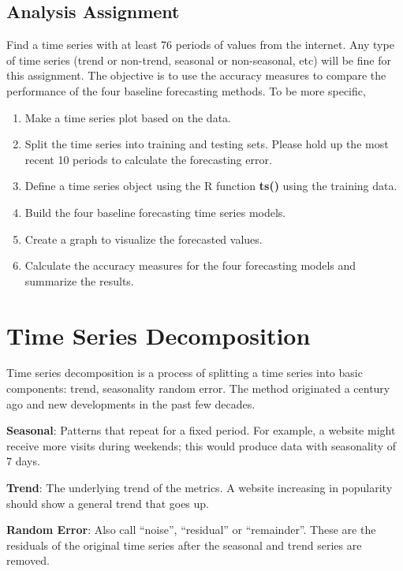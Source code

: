 \documentclass[
]{book}
\begin{document}
\hypertarget{analysis-assignment-5}{%
\section{Analysis Assignment}\label{analysis-assignment-5}}

Find a time series with at least 76 periods of values from the internet. Any type of time series (trend or non-trend, seasonal or non-seasonal, etc) will be fine for this assignment. The objective is to use the accuracy measures to compare the performance of the four baseline forecasting methods. To be more specific,

\begin{enumerate}
\def\labelenumi{\arabic{enumi}.}
\item
  Make a time series plot based on the data.
\item
  Split the time series into training and testing sets. Please hold up the most recent 10 periods to calculate the forecasting error.
\item
  Define a time series object using the R function \textbf{ts()} using the training data.
\item
  Build the four baseline forecasting time series models.
\item
  Create a graph to visualize the forecasted values.
\item
  Calculate the accuracy measures for the four forecasting models and summarize the results.
\end{enumerate}

\hypertarget{time-series-decomposition}{%
\chapter{Time Series Decomposition}\label{time-series-decomposition}}

Time series decomposition is a process of splitting a time series into basic components: trend, seasonality random error. The method originated a century ago and new developments in the past few decades.

\textbf{Seasonal}: Patterns that repeat for a fixed period. For example, a website might receive more visits during weekends; this would produce data with seasonality of 7 days.

\textbf{Trend}: The underlying trend of the metrics. A website increasing in popularity should show a general trend that goes up.

\textbf{Random Error}: Also call ``noise'', ``residual'' or ``remainder''. These are the residuals of the original time series after the seasonal and trend series are removed.
\end{document}
